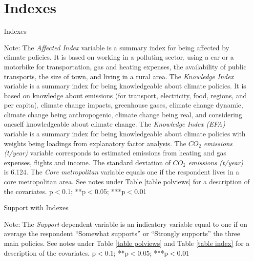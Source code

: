 \documentclass{article}
\begin{document}
\clearpage
\section{Indexes}

\begin{table}[h!]
	\caption{Indexes}\label{table index}
	\begin{center}
		\scalebox{0.7}{}
	\end{center}
	{\footnotesize Note: The \textit{Affected Index} variable is a summary index for being affected by climate policies. It is based on working in a polluting sector, using a car or a motorbike for transportation, gas and heating expenses, the availability of public transports, the size of town, and living in a rural area. The \textit{Knowledge Index} variable is a summary index for being knowledgeable about climate policies. It is based on knowledge about emissions  (for transport, electricity, food, regions, and per capita), climate change impacts, greenhouse gases, climate change dynamic, climate change being anthropogenic, climate change being real, and considering oneself knowledgeable about climate change. The \textit{Knowledge Index (EFA)} variable is a summary index for being knowledgeable about climate policies with weights being loadings from explanatory factor analysis. The \textit{$CO_2$ emissions (t/year)} variable corresponds to estimated emissions from heating and gas expenses, flights and income. The standard deviation of \textit{$CO_2$ emissions (t/year)} is 6.124. The \textit{Core metropolitan} variable equals one if the respondent lives in a core metropolitan area. See notes under Table \ref{table polviews} for a description of the covariates.
	\newline *p$<$0.1; **p$<$0.05; ***p$<$0.01}
\end{table}	

\begin{table}[h!]
	\caption{Support with Indexes}
	\begin{center}
		\scalebox{0.7}{}
	\end{center}
	{\footnotesize Note: The \textit{Support} dependent variable is an indicatory variable equal to one if on average the respondent ``Somewhat supports'' or ``Strongly supports'' the three main policies. See notes under Table \ref{table polviews} and Table \ref{table index} for a description of the covariates.
	\newline *p$<$0.1; **p$<$0.05; ***p$<$0.01}
\end{table}	
\end{document}
